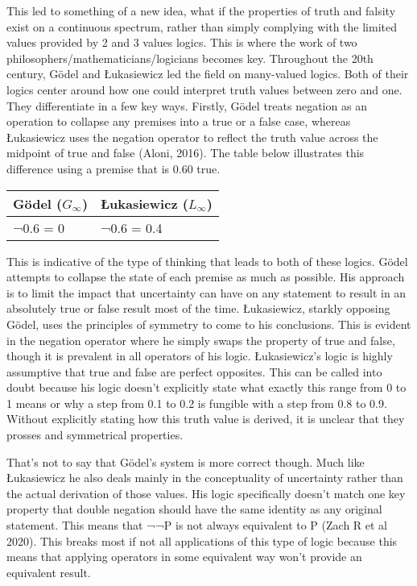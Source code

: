 \documentclass{article}
\begin{document}
This led to something of a new idea, what if the properties of truth and falsity exist on a continuous spectrum, rather than simply complying with the limited values provided by 2 and 3 values logics. This is where the work of two philosophers/mathematicians/logicians becomes key. Throughout the 20th century, Gödel and Łukasiewicz led the field on many-valued logics. Both of their logics center around how one could interpret truth values between zero and one. They differentiate in a few key ways. Firstly, Gödel treats negation as an operation to collapse any premises into a true or a false case, whereas Łukasiewicz uses the negation operator to reflect the truth value across the midpoint of true and false (Aloni, 2016). The table below illustrates this difference using a premise that is 0.60 true. 

\begin{center}
\begin{tabularx}{0.8\textwidth} { 
  | >{\centering\arraybackslash}X 
  | >{\centering\arraybackslash}X  | }
 \hline
 Gödel ($G_\infty$) &  Łukasiewicz ($L_\infty$) \\
 \hline
 ¬0.6 = 0  & ¬0.6 = 0.4  \\
\hline
\end{tabularx}
\end{center}

This is indicative of the type of thinking that leads to both of these logics. Gödel attempts to collapse the state of each premise as much as possible. His approach is to limit the impact that uncertainty can have on any statement to result in an absolutely true or false result most of the time. Łukasiewicz, starkly opposing Gödel, uses the principles of symmetry to come to his conclusions. This is evident in the negation operator where he simply swaps the property of true and false, though it is prevalent in all operators of his logic. Łukasiewicz’s logic is highly assumptive that true and false are perfect opposites. This can be called into doubt because his logic doesn’t explicitly state what exactly this range from 0 to 1 means or why a step from 0.1 to 0.2 is fungible with a step from 0.8 to 0.9. Without explicitly stating how this truth value is derived, it is unclear that they prosses and symmetrical properties. 

That’s not to say that Gödel’s system is more correct though. Much like Łukasiewicz he also deals mainly in the conceptuality of uncertainty rather than the actual derivation of those values. His logic specifically doesn’t match one key property that double negation should have the same identity as any original statement. This means that ¬¬P is not always equivalent to P (Zach R et al 2020). This breaks most if not all applications of this type of logic because this means that applying operators in some equivalent way won’t provide an equivalent result.
\end{document}
